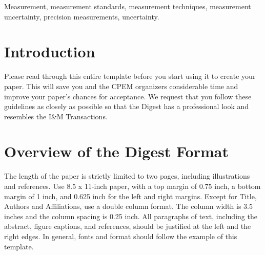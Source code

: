 \documentclass[]{IEEEtran}
\begin{document}
\maketitle

\IEEEpubidadjcol



\begin{abstract}
This paper describes how to prepare a 2-page summary paper for CPEM 2024.  Please observe the instructions carefully.  The abstract is the first paragraph of the summary: it identifies the paper and its major contribution.  It should be limited to a few lines (ideally no more than 150 words).  After the abstract, you should list key words that describe your paper. Keywords can be chosen from the IEEE Taxonomy list (available at ieee.org). Typically, you should list about 5 to 7 key words, alphabetically.
\end{abstract}



\begin{IEEEkeywords}
Measurement, measurement standards, measurement techniques, measurement uncertainty, precision measurements, uncertainty.
\end{IEEEkeywords}






\section{Introduction}
Please read through this entire template before you start using it to create your paper.  This will save you and the CPEM organizers considerable time and improve your paper's chances for acceptance.  We request that you follow these guidelines as closely as possible so that the Digest has a professional look and resembles the I\&M Transactions.


\section{Overview of the Digest Format}
The length of the paper is strictly limited to two pages, including illustrations and references. Use 8.5 x 11-inch paper, with a top margin of 0.75 inch, a bottom margin of 1 inch, and 0.625 inch for the left and right margins. Except for Title, Authors and Affiliations, use a double column format. The column width is 3.5 inches and the column spacing is 0.25 inch. All paragraphs of text, including the abstract, figure captions, and references, should be justified at the left and the right edges. In general, fonts and format should follow the example of this template.
\end{document}

